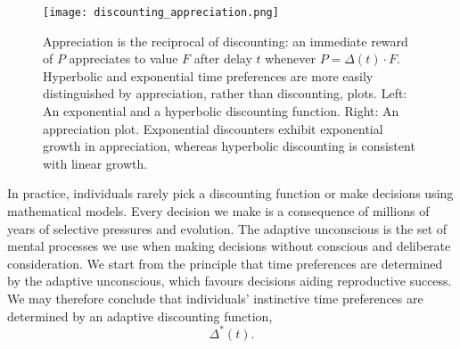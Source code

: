 \documentclass[titlepage, hidelinks, 12pt]{article}
\theoremstyle{plain}
\theoremstyle{remark}
\theoremstyle{definition}
\DeclareMathOperator{\hyp}{hyp}
\begin{document}
\begin{figure}[H]
    \centering
    \texttt{[image: discounting\_appreciation.png]}
    \caption[Example discounting and corresponding appreciation schedules.]{Appreciation is the reciprocal of discounting: an immediate reward of $P$ appreciates to value $F$ after delay $t$ whenever
        $P = \Delta(t)\cdot F$. 
        Hyperbolic and exponential time preferences are more easily distinguished by appreciation, rather than discounting, plots.
            Left: An exponential and a hyperbolic discounting function. Right: An appreciation plot. Exponential discounters exhibit exponential
        growth in appreciation, whereas hyperbolic discounting is consistent with linear growth.}
\end{figure}


%        


In practice, individuals rarely pick a discounting function or make decisions using mathematical models. 
Every decision we make is a consequence of millions of years of selective pressures and evolution. The adaptive unconscious \cite{wegner02} is 
the set of mental processes we use when making decisions without conscious and deliberate consideration. We start from the principle
that time preferences are determined by the adaptive unconscious,
which favours decisions aiding reproductive success. 
We may therefore conclude that individuals' instinctive time preferences are determined by an adaptive discounting function,
\begin{equation}
    \Delta^*(t).
    \label{eqn:adaptive_discounting}
\end{equation}
\end{document}
